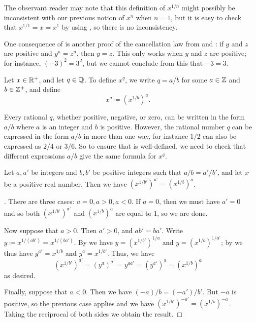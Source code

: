 \begin{note}
  The observant reader may note that this definition of \(x^{1 / n}\) might possibly be inconsistent with our previous notion of \(x^n\) when \(n = 1\), but it is easy to check that \(x^{1 / 1} = x = x^1\) by using , so there is no inconsistency.
\end{note}

\begin{note}
  One consequence of  is another proof of the cancellation law from  and :
  if \(y\) and \(z\) are positive and \(y^n = z^n\), then \(y = z\).
  This only works when \(y\) and \(z\) are positive;
  for instance, \((-3)^2 = 3^2\), but we cannot conclude from this that \(-3 = 3\).
\end{note}

\begin{defn}\label{i:5.6.7}
  Let \(x \in \mathbb{R}^+\), and let \(q \in \mathbb{Q}\).
  To define \(x^q\), we write \(q = a / b\) for some \(a \in \mathbb{Z}\) and \(b \in \mathbb{Z}^+\), and define
  \[
    x^q \coloneqq (x^{1 / b})^a.
  \]
\end{defn}

\begin{note}
  Every rational \(q\), whether positive, negative, or zero, can be written in the form \(a / b\) where \(a\) is an integer and \(b\) is positive.
  However, the rational number \(q\) can be expressed in the form \(a / b\) in more than one way, for instance \(1 / 2\) can also be expressed as \(2 / 4\) or \(3 / 6\).
  So to ensure that  is well-defined, we need to check that different expressions \(a / b\) give the same formula for \(x^q\).
\end{note}

\begin{lem}\label{i:5.6.8}
  Let \(a, a'\) be integers and \(b, b'\) be positive integers such that \(a / b = a' / b'\), and let \(x\) be a positive real number.
  Then we have \((x^{1 / b'})^{a'} = (x^{1 / b})^a\).
\end{lem}

\begin{proof}[]
  There are three cases: \(a = 0, a > 0, a < 0\).
  If \(a = 0\), then we must have \(a' = 0\) and so both \((x^{1 / b'})^{a'}\) and \((x^{1 / b})^a\) are equal to 1, so we are done.

  Now suppose that \(a > 0\).
  Then \(a' > 0\), and \(ab' = ba'\).
  Write \(y \coloneqq x^{1 / (ab')} = x^{1 / (ba')}\).
  By  we have \(y = (x^{1 / b'})^{1 / a}\) and \(y = (x^{1 / b})^{1 / a'}\);
  by  we thus have \(y^{a'} = x^{1 / b}\) and \(y^a = x^{1 / b'}\).
  Thus, we have
  \[
    (x^{1 / b'})^{a'} = (y^a)^{a'} = y^{aa'} = (y^{a'})^a = (x^{1 / b})^a
  \]
  as desired.

  Finally, suppose that \(a < 0\).
  Then we have \((-a) / b = (-a') / b'\).
  But \(-a\) is positive, so the previous case applies and we have \((x^{1 / b'})^{-a'} = (x^{1 / b})^{-a}\).
  Taking the reciprocal of both sides we obtain the result.
\end{proof}

